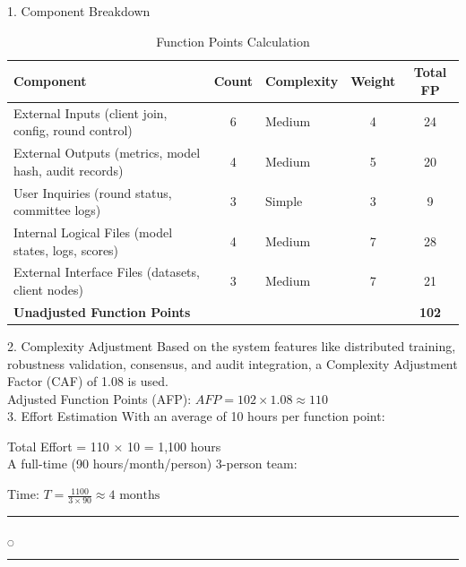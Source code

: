 1. Component Breakdown

\begin{table}[h!]
\centering
\begin{tabular}{|l|c|l|c|c|}
\hline
\textbf{Component}                                   & \textbf{Count} & \textbf{Complexity} & \textbf{Weight} & \textbf{Total FP} \\
\hline
External Inputs (client join, config, round control)              & 6     & Medium     & 4      & 24       \\
External Outputs (metrics, model hash, audit records)          & 4     & Medium     & 5      & 20       \\
User Inquiries (round status, committee logs)             & 3     & Simple     & 3      & 9       \\
Internal Logical Files (model states, logs, scores) & 4     & Medium     & 7      & 28       \\
External Interface Files (datasets, client nodes)             & 3     & Medium     & 7      & 21       \\
\hline
\textbf{Unadjusted Function Points}              &       &            &        & \textbf{102}  \\
\hline
\end{tabular}
\caption{Function Points Calculation}
\label{tab:function_points}
\end{table}

2. Complexity Adjustment
Based on the system features like distributed training, robustness validation, consensus, and audit integration, a Complexity Adjustment Factor (CAF) of 1.08 is used.
\\
Adjusted Function Points (AFP): $AFP = 102 \times 1.08 \approx 110$\\

3. Effort Estimation
With an average of 10 hours per function point:

Total Effort = 110 × 10 = 1,100 hours\\

A full-time (90 hours/month/person) 3-person team:

Time: $T = \frac{1100}{3 \times 90} \approx 4 \text{ months}$

\rule{0.49\textwidth}{0.75pt} $_{\bigcirc}$ \rule{0.49\textwidth}{0.75pt}\\
